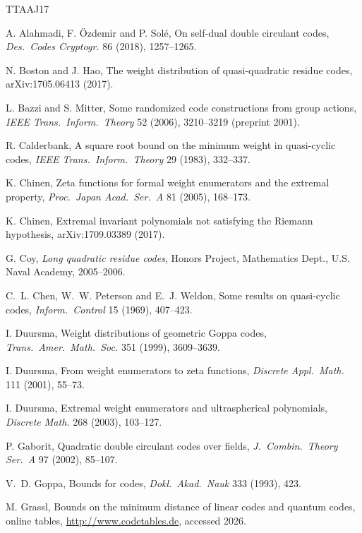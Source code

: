 \documentclass[12pt,letterpaper]{article}
\theoremstyle{definition}
\theoremstyle{remark}
\numberwithin{equation}{section}
\begin{document}
\begin{thebibliography}{TTAAJ17}\small

 A. Alahmadi, F. \"Ozdemir and P. Sol\'e, On self-dual double
circulant codes, \emph{Des.\ Codes Cryptogr.} 86 (2018), 1257--1265.

 N. Boston and J. Hao, The weight distribution of quasi-quadratic
residue codes, arXiv:1705.06413 (2017).

 L. Bazzi and S. Mitter, Some randomized code constructions from
group actions, \emph{IEEE Trans.\ Inform.\ Theory} 52 (2006), 3210--3219
(preprint 2001).

 R. Calderbank, A square root bound on the minimum weight in
quasi-cyclic codes, \emph{IEEE Trans.\ Inform.\ Theory} 29 (1983), 332--337.

 K. Chinen, Zeta functions for formal weight enumerators and the
extremal property, \emph{Proc.\ Japan Acad.\ Ser.\ A} 81 (2005), 168--173.

 K. Chinen, Extremal invariant polynomials not satisfying the Riemann
hypothesis, arXiv:1709.03389 (2017).

 G. Coy, \emph{Long quadratic residue codes}, Honors Project,
Mathematics Dept., U.S. Naval Academy, 2005--2006.

 C.~L. Chen, W.~W. Peterson and E.~J. Weldon, Some results on
quasi-cyclic codes, \emph{Inform.\ Control} 15 (1969), 407--423.

 I. Duursma, Weight distributions of geometric Goppa codes,
\emph{Trans.\ Amer.\ Math.\ Soc.} 351 (1999), 3609--3639.

 I. Duursma, From weight enumerators to zeta functions,
\emph{Discrete Appl.\ Math.} 111 (2001), 55--73.

 I. Duursma, Extremal weight enumerators and ultraspherical
polynomials, \emph{Discrete Math.} 268 (2003), 103--127.

 P. Gaborit, Quadratic double circulant codes over fields,
\emph{J.\ Combin.\ Theory Ser.\ A} 97 (2002), 85--107.

 V.~D. Goppa, Bounds for codes, \emph{Dokl.\ Akad.\ Nauk} 333 (1993),
423.

 M. Grassl, Bounds on the minimum distance of linear codes and quantum
codes, online tables, \url{http://www.codetables.de}, accessed 2026.


\end{thebibliography}
\end{document}
